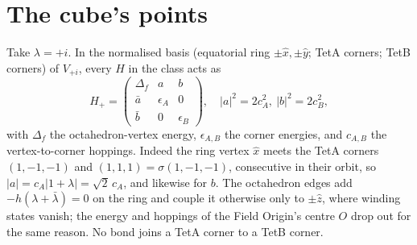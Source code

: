 \documentclass[twocolumn]{iopjournal}
\theoremstyle{definition}
\theoremstyle{remark}
\begin{document}

\section{The cube's points}

Take $\lambda = +i$. In the normalised basis (equatorial ring
$\pm\hat x,\pm\hat y$; TetA corners; TetB corners) of $V_{+i}$, every
$H$ in the class acts as
\begin{equation}
H_+ = \begin{pmatrix}\Delta_f & a & b\\ \bar a & \epsilon_A & 0\\
\bar b & 0 & \epsilon_B\end{pmatrix},\quad
\lvert a\rvert^2 = 2c_A^2,\ \lvert b\rvert^2 = 2c_B^2,
\label{eq:block}
\end{equation}
with $\Delta_f$ the octahedron-vertex energy, $\epsilon_{A,B}$ the
corner energies, and $c_{A,B}$ the vertex-to-corner hoppings. Indeed
the ring vertex $\hat x$ meets the TetA corners $(1,-1,-1)$ and
$(1,1,1) = \sigma(1,-1,-1)$, consecutive in their orbit, so
$\lvert a\rvert = c_A\lvert 1 + \lambda\rvert = \sqrt2\,c_A$, and
likewise for $b$. The octahedron edges add $-h(\lambda + \bar\lambda) =
0$ on the ring and couple it otherwise only to $\pm\hat z$, where
winding states vanish; the energy and hoppings of the Field Origin's
centre $O$ drop out for the same reason. No bond joins a TetA corner to a TetB corner.
\end{document}
